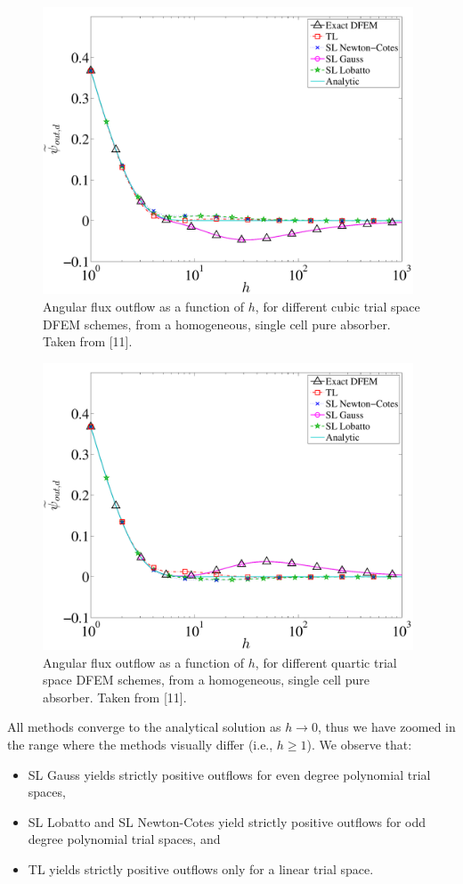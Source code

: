 \begin{figure}[!htp]
\centering
\includegraphics[width=11cm]{chapter2_constant_xs/P3_Outflow_AllMeth-eps-converted-to.pdf}
\caption{Angular flux outflow as a function of $h$, for different cubic trial space DFEM schemes, from a homogeneous, single cell pure absorber.  Taken from [11].}
\label{fig:p3_outflow}
\end{figure}
\begin{figure}[!hbp]
\centering
\includegraphics[width=11cm]{chapter2_constant_xs/P4_Outflow_AllMeth-eps-converted-to.pdf}
\caption{Angular flux outflow as a function of $h$, for different quartic trial space DFEM schemes, from a homogeneous, single cell pure absorber.  Taken from [11].}
\label{fig:p4_outflow}
\end{figure}
All methods converge to the analytical solution as $h\to 0$, thus we have zoomed in the range where the methods  visually differ (i.e., $h \ge 1$). 
We observe that:
\begin{itemize}
\item SL Gauss yields strictly positive outflows for even degree polynomial trial spaces,
\item SL Lobatto and SL Newton-Cotes yield strictly positive outflows for odd degree polynomial trial spaces, and
\item TL yields strictly positive outflows only for a linear trial space.
\end{itemize}
